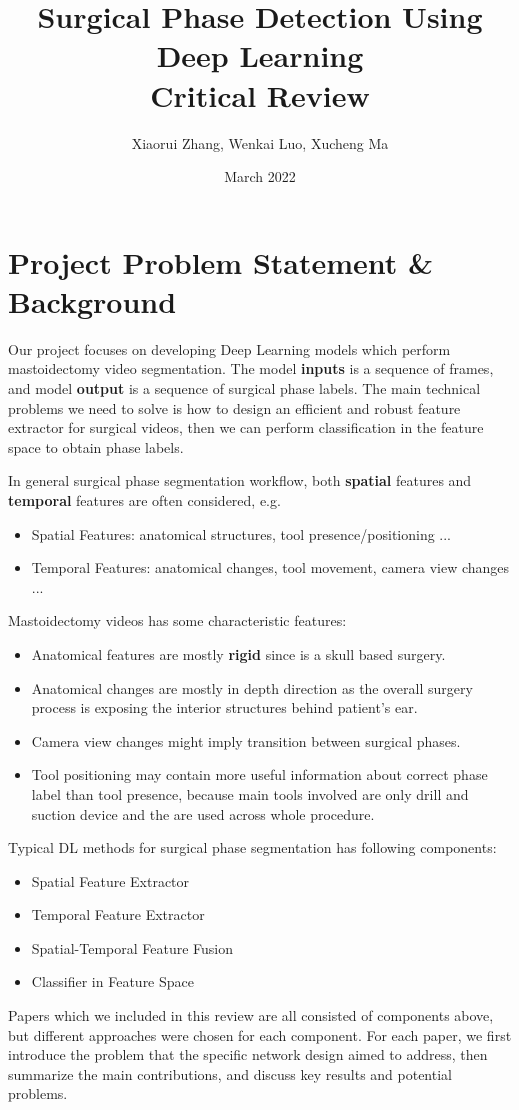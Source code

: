 \documentclass[11pt]{article} \usepackage[top=1in, bottom=1in, left=1in, right=1in]{geometry}
\title{Surgical Phase Detection Using Deep Learning\\ Critical Review}
\author{Xiaorui Zhang, Wenkai Luo, Xucheng Ma}
\date{March 2022}
\begin{document}
\maketitle
\section{Project Problem Statement \& Background}
Our project focuses on developing Deep Learning models which perform mastoidectomy video segmentation. The model \textbf{inputs} is a sequence of frames, and model \textbf{output} is a sequence of surgical phase labels. The main technical problems we need to solve is how to design an efficient and robust feature extractor for surgical videos, then we can perform classification in the feature space to obtain phase labels.

\vspace{0.25cm}
\noindent
In general surgical phase segmentation workflow, both \textbf{spatial} features and \textbf{temporal} features are often considered, e.g.
\begin{itemize}
  \item Spatial Features: anatomical structures, tool presence/positioning ...
  \item Temporal Features: anatomical changes, tool movement, camera view changes​ ...
\end{itemize}
Mastoidectomy videos has some characteristic features:
\begin{itemize}
  \item Anatomical features are mostly \textbf{rigid} since is a skull based surgery. 
  \item Anatomical changes are mostly in depth direction as the overall surgery process is exposing the interior structures behind patient's ear.
  \item Camera view changes might imply transition between surgical phases.
  \item Tool positioning may contain more useful information about correct phase label than tool presence, because main tools involved are only drill and suction device and the are used across whole procedure.
\end{itemize}

\vspace{0.25cm}
\noindent
Typical DL methods for surgical phase segmentation has following components:
\begin{itemize}
  \item Spatial Feature Extractor
  \item Temporal Feature Extractor
  \item Spatial-Temporal Feature Fusion
  \item Classifier in Feature Space
\end{itemize}
Papers which we included in this review are all consisted of components above, but different approaches were chosen for each component. For each paper, we first introduce the problem that the specific network design aimed to address, then summarize the main contributions, and discuss key results and potential problems.
\end{document}
